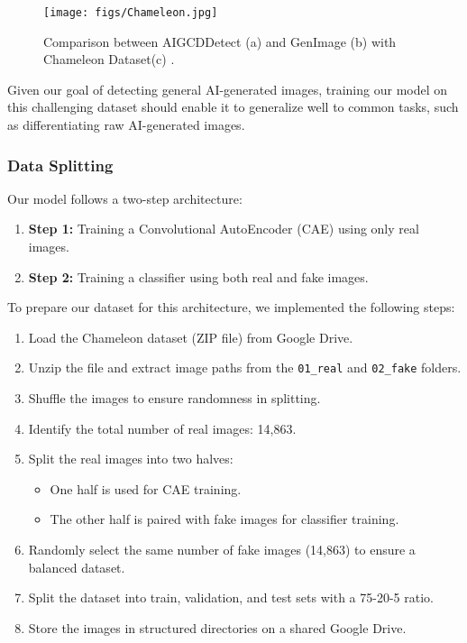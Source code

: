 \documentclass{article} %
\begin{document}
\begin{figure}[h]
    \centering
    \texttt{[image: figs/Chameleon.jpg]}
    \caption{Comparison between AIGCDDetect (a) and GenImage (b) with Chameleon Dataset(c) \citep{yan2024sanity}.}
    \label{fig:Chameleon}
\end{figure}

Given our goal of detecting general AI-generated images, training our model on this challenging dataset should enable it to generalize well to common tasks, such as differentiating raw AI-generated images.

\subsubsection{Data Splitting}
Our model follows a two-step architecture:
\begin{enumerate}
    \item \textbf{Step 1:} Training a Convolutional AutoEncoder (CAE) using only real images.
    \item \textbf{Step 2:} Training a classifier using both real and fake images.
\end{enumerate}

To prepare our dataset for this architecture, we implemented the following steps:
\begin{enumerate}
    \item Load the Chameleon dataset (ZIP file) from Google Drive.
    \item Unzip the file and extract image paths from the \texttt{01\_real} and \texttt{02\_fake} folders.
    \item Shuffle the images to ensure randomness in splitting.
    \item Identify the total number of real images: 14,863.
    \item Split the real images into two halves:
    \begin{itemize}
        \item One half is used for CAE training.
        \item The other half is paired with fake images for classifier training.
    \end{itemize}
    \item Randomly select the same number of fake images (14,863) to ensure a balanced dataset.
    \item Split the dataset into train, validation, and test sets with a 75-20-5 ratio.
    \item Store the images in structured directories on a shared Google Drive.
\end{enumerate}
\end{document}
